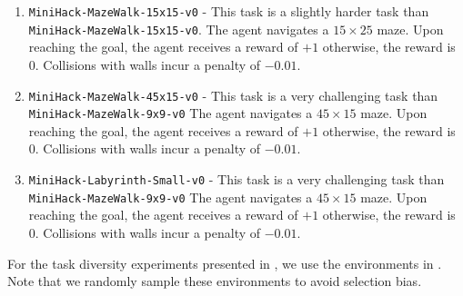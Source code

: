 \begin{enumerate}
    \item \texttt{MiniHack-MazeWalk-15x15-v0} - This task is a slightly harder task than \texttt{MiniHack-MazeWalk-15x15-v0}. The agent navigates a $15 \times 25$ maze. Upon reaching the goal, the agent receives a reward of $+1$ otherwise, the reward is $0$. Collisions with walls incur a penalty of $-0.01$. 
    \item \texttt{MiniHack-MazeWalk-45x15-v0} - This task is a very challenging task than \texttt{MiniHack-MazeWalk-9x9-v0} The agent navigates a $45 \times 15$ maze. Upon reaching the goal, the agent receives a reward of $+1$ otherwise, the reward is $0$. Collisions with walls incur a penalty of $-0.01$. 
    \item \texttt{MiniHack-Labyrinth-Small-v0} - This task is a very challenging task than \texttt{MiniHack-MazeWalk-9x9-v0} The agent navigates a $45 \times 15$ maze. Upon reaching the goal, the agent receives a reward of $+1$ otherwise, the reward is $0$. Collisions with walls incur a penalty of $-0.01$. 
\end{enumerate}

For the task diversity experiments presented in , we use the environments in . Note that we randomly sample these environments to avoid selection bias. 


